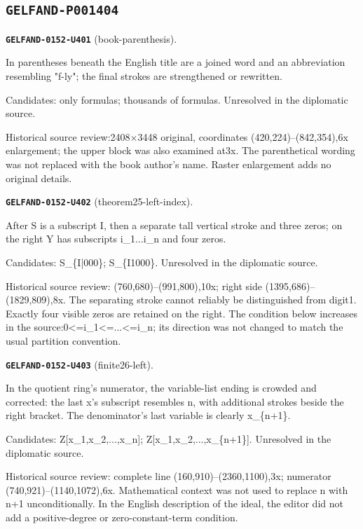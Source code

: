\subsection*{\texttt{GELFAND-P001404}}
\par\noindent\leavevmode{}\label{GELFAND-0152-U401}\textbf{\texttt{GELFAND-0152-U401}} (book-parenthesis).\nopagebreak[4]\par
In parentheses beneath the English title are a joined word and an abbreviation resembling "f-ly"; the final strokes are strengthened or rewritten.\par
Candidates: only formulas; thousands of formulas. Unresolved in the diplomatic source.\par
Historical source review:2408×3448 original, coordinates (420,224)–(842,354),6x enlargement; the upper block was also examined at3x. The parenthetical wording was not replaced with the book author's name. Raster enlargement adds no original details.\par\medskip
\par\noindent\leavevmode{}\label{GELFAND-0152-U402}\textbf{\texttt{GELFAND-0152-U402}} (theorem25-left-index).\nopagebreak[4]\par
After S is a subscript I, then a separate tall vertical stroke and three zeros; on the right Y has subscripts i\_1...i\_n and four zeros.\par
Candidates: S\_\{I|000\}; S\_\{I1000\}. Unresolved in the diplomatic source.\par
Historical source review: (760,680)–(991,800),10x; right side (1395,686)–(1829,809),8x. The separating stroke cannot reliably be distinguished from digit1. Exactly four visible zeros are retained on the right. The condition below increases in the source:0<=i\_1<=...<=i\_n; its direction was not changed to match the usual partition convention.\par\medskip
\par\noindent\leavevmode{}\label{GELFAND-0152-U403}\textbf{\texttt{GELFAND-0152-U403}} (finite26-left).\nopagebreak[4]\par
In the quotient ring's numerator, the variable-list ending is crowded and corrected: the last x's subscript resembles n, with additional strokes beside the right bracket. The denominator's last variable is clearly x\_\{n+1\}.\par
Candidates: Z[x\_1,x\_2,...,x\_n]; Z[x\_1,x\_2,...,x\_\{n+1\}]. Unresolved in the diplomatic source.\par
Historical source review: complete line (160,910)–(2360,1100),3x; numerator (740,921)–(1140,1072),6x. Mathematical context was not used to replace n with n+1 unconditionally. In the English description of the ideal, the editor did not add a positive-degree or zero-constant-term condition.\par\medskip
